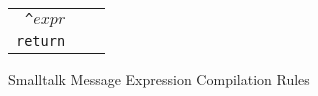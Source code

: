 \documentclass[11pt]{article}
\begin{document}
\begin{figure}
\begin{center}
\begin{tabular}[t]{r | l | l }
{\tt\Large \verb=^=}$expr$ &
\begin{minipage}[t]{0.2\linewidth}
$expr$\\
{\tt return}\vspace{5pt}
\end{minipage} & \\

\end{tabular}
\end{center}
\vspace{-10pt}
\caption{Smalltalk Message Expression Compilation Rules}
\label{default}
\end{figure}%

\begin{minipage}[t]{0.25\linewidth}
\end{minipage} 

\begin{minipage}[t]{0.25\linewidth}
\begin{alltt}
\end{alltt}
\end{minipage} 
\end{document}
